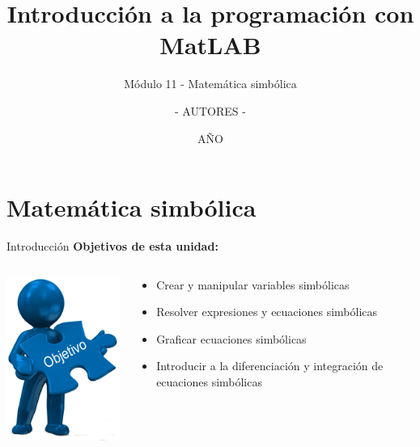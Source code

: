 \documentclass{bredelebeamer}
\title[Programación en MatLAB]{Introducción a la programación con MatLAB}
\subtitle{Módulo 11 - Matemática simbólica}
\author{- AUTORES -\inst{1}}
\institute[UNIVERSIDAD]
{
  \inst{1}%
  - NOMBRE UNIVERSIDAD -
  }
\date{AÑO}
\begin{document}
\begin{frame}
  \titlepage 
\end{frame}



\section{Matemática simbólica}

\begin{frame}{Introducción}
\textbf{Objetivos de esta unidad:}




\begin{columns}
\begin{column}{0.35\textwidth}
\begin{center}
\includegraphics[scale=0.4]{images/img40.png}
\end{center}
\end{column}
\begin{column}{0.8\textwidth}
\begin{center}
\begin{itemize}
\item Crear y manipular variables simbólicas
\item Resolver expresiones y ecuaciones simbólicas
\item Graficar ecuaciones simbólicas
\item Introducir a la diferenciación y integración de ecuaciones simbólicas
\end{itemize}
\end{center}
\end{column}
\end{columns}




\end{frame}
\end{document}

